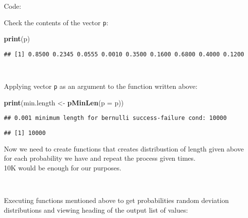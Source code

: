 \documentclass[]{article}
\newenvironment{Shaded}{\begin{snugshade}}{\end{snugshade}}
\newcommand{\CommentTok}[1]{\textcolor[rgb]{0.56,0.35,0.01}{\textit{#1}}}
\newcommand{\DataTypeTok}[1]{\textcolor[rgb]{0.13,0.29,0.53}{#1}}
\newcommand{\DecValTok}[1]{\textcolor[rgb]{0.00,0.00,0.81}{#1}}
\newcommand{\KeywordTok}[1]{\textcolor[rgb]{0.13,0.29,0.53}{\textbf{#1}}}
\newcommand{\NormalTok}[1]{#1}
\newcommand{\OperatorTok}[1]{\textcolor[rgb]{0.81,0.36,0.00}{\textbf{#1}}}
\newcommand{\OtherTok}[1]{\textcolor[rgb]{0.56,0.35,0.01}{#1}}
\newcommand{\StringTok}[1]{\textcolor[rgb]{0.31,0.60,0.02}{#1}}
\begin{document}
Code:

Check the contents of the vector \texttt{p}:

\begin{Shaded}
\begin{Highlighting}[]
\KeywordTok{print}\NormalTok{(p)}
\end{Highlighting}
\end{Shaded}

\begin{verbatim}
## [1] 0.8500 0.2345 0.0555 0.0010 0.3500 0.1600 0.6800 0.4000 0.1200
\end{verbatim}

~

Applying vector \texttt{p} as an argument to the function written above:

\begin{Shaded}
\begin{Highlighting}[]
\KeywordTok{print}\NormalTok{(min.length <-}\StringTok{ }\KeywordTok{pMinLen}\NormalTok{(}\DataTypeTok{p =}\NormalTok{ p))}
\end{Highlighting}
\end{Shaded}

\begin{verbatim}
## 0.001 minimum length for bernulli success-failure cond: 10000
\end{verbatim}

\begin{verbatim}
## [1] 10000
\end{verbatim}

Now we need to create functions that creates distribustion of length
given above for each probability we have and repeat the process given
times.\\
10K would be enough for our purposes.

~

Executing functions mentioned above to get probabilities random
deviation distributions and viewing heading of the output list of
values:

\begin{Shaded}
\end{Shaded}
\end{document}

